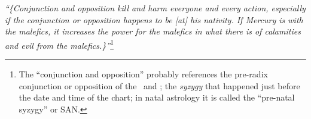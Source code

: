 \textsl{``\{Conjunction and opposition kill and harm everyone and every action, especially if the conjunction or opposition happens to be [at] his nativity. If Mercury is with the malefics, it increases the power for the malefics in what there is of calamities and evil from the malefics.\}''}\footnote{The ``conjunction and opposition'' probably  references  the pre-radix conjunction or opposition of the \Sun\, and \Moon; the \textsl{syzygy} that happened just before the date and time of the chart; in natal astrology it is called the ``pre-natal syzygy'' or SAN.}











